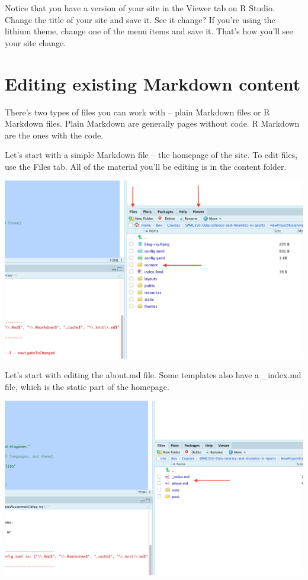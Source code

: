 \documentclass[
]{book}
\begin{document}
Notice that you have a version of your site in the Viewer tab on R Studio. Change the title of your site and save it. See it change? If you're using the lithium theme, change one of the menu items and save it. That's how you'll see your site change.

\hypertarget{editing-existing-markdown-content}{%
\section{Editing existing Markdown content}\label{editing-existing-markdown-content}}

There's two types of files you can work with -- plain Markdown files or R Markdown files. Plain Markdown are generally pages without code. R Markdown are the ones with the code.

Let's start with a simple Markdown file -- the homepage of the site. To edit files, use the Files tab. All of the material you'll be editing is in the content folder.

\includegraphics[width=27.69in]{images/blog4}

Let's start with editing the about.md file. Some templates also have a \_index.md file, which is the static part of the homepage.

\includegraphics[width=28.81in]{images/blog5}
\end{document}
